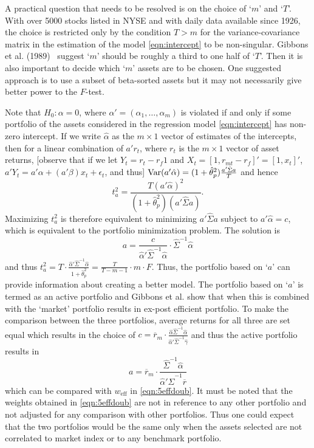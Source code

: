 A practical question that needs to be resolved is on the choice of `$m$' and `$T$'. With over 5000 stocks listed in NYSE and with daily data available since 1926, the choice is restricted only by the condition $T > m$ for the variance-covariance matrix in the estimation of the model \eqref{eqn:intercept} to be non-singular. Gibbons et al. (1989)~\cite{gibbons} suggest `$m$' should be roughly a third to one half of `$T$'. Then it is also important to decide which `$m$' assets are to be chosen. One suggested approach is to use a subset of beta-sorted assets but it may not necessarily give better power to the $F$-test. 
	
	
Note that $H_0: \alpha= 0$, where $\alpha'= (\alpha_1, \ldots, \alpha_m)$ is violated if and only if some portfolio of the assets considered in the regression model \eqref{eqn:intercept} has non-zero intercept. If we write $\hat{\alpha}$ as the $m \times 1$ vector of estimates of the intercepts, then for a linear combination of $a' r_t$, where $r_t$ is the $m \times 1$ vector of asset returns, [observe that if we let $Y_t= r_t - r_f1$ and $X_t= [1, r_{mt} - r_f]'= [1, x_t]'$, $a'Y_t= a' \alpha + (a' \beta) x_t + \epsilon_t$, and thus] $\operatorname{Var}(a'\hat{\alpha})= (1 + \hat{\theta}_p^2) \frac{a' \hat{\Sigma}a}{T}$ and hence
	\begin{equation} \label{eqn:smallt}
	t_a^2= \dfrac{T(a'\hat{\alpha})^2}{(1+\hat{\theta}_p^2)(a' \hat{\Sigma} a)}.
	\end{equation}
Maximizing $t_a^2$ is therefore equivalent to minimizing $a' \hat{\Sigma}a$ subject to $a' \hat{\alpha}= c$, which is equivalent to the portfolio minimization problem. The solution is
	\begin{equation} \label{eqn:5a}
	a= \dfrac{c}{\hat{\alpha}' \hat{\Sigma}^{-1} \hat{\alpha}} \cdot \hat{\Sigma}^{-1} \hat{\alpha}
	\end{equation}
and thus $t_a^2= T \cdot \frac{\hat{\alpha}' \hat{\Sigma}^{-1} \hat{\alpha}}{1+\hat{\theta}_p^2}= \frac{T}{T - m - 1} \cdot m \cdot F$. Thus, the portfolio based on `$a$' can provide information about creating a better model. The portfolio based on `$a$' is termed as an active portfolio and Gibbons et al. show that when this is combined with the `market' portfolio results in ex-post efficient portfolio. To make the comparison between the three portfolios, average returns for all three are set equal which results in the choice of $c= \overline{r}_m \cdot \frac{\hat{\alpha} \hat{\Sigma}^{-1} \hat{\alpha}}{\hat{\alpha}' \hat{\Sigma}^{-1} \hat{\gamma}}$ and thus the active portfolio results in 
	\begin{equation} \label{eqn:5a2}
	a= \overline{r}_m \cdot \dfrac{\hat{\Sigma}^{-1} \hat{\alpha}}{\hat{\alpha}' \hat{\Sigma}^{-1} \overline{r}}
	\end{equation}	
which can be compared with $w_{\text{eff}}$ in \eqref{eqn:5effdoub}. It must be noted that the weights obtained in \eqref{eqn:5effdoub} are not in reference to any other portfolio and not adjusted for any comparison with other portfolios. Thus one could expect that the two portfolios would be the same only when the assets selected are not correlated to market index or to any benchmark portfolio. 


